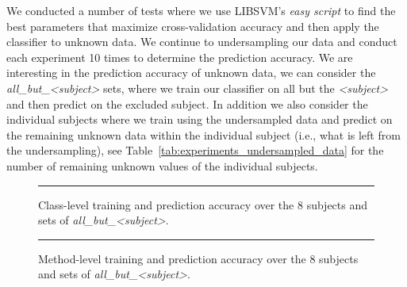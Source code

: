 We conducted a number of tests where we use LIBSVM's \emph{easy script} to find the best parameters that maximize cross-validation accuracy and then apply the classifier to unknown data. We continue to undersampling our data and conduct each experiment 10 times to determine the prediction accuracy. We are interesting in the prediction accuracy of unknown data, we can consider the \emph{all\_but\_<subject>} sets, where we train our classifier on all but the \emph{<subject>} and then predict on the excluded subject. In addition we also consider the individual subjects where we train using the undersampled data and predict on the remaining unknown data within the individual subject (i.e., what is left from the undersampling), see Table~\ref{tab:experiments_undersampled_data} for the number of remaining unknown values of the individual subjects.

\begin{figure}[!ht]
  \centering
  \begin{adjustbox}{max size={.95\textwidth}{.95\textheight}}
    
  \end{adjustbox}
  \caption{Class-level training and prediction accuracy over the 8 subjects and sets of \emph{all\_but\_<subject>}.}
  \vspace{2mm}
  \hrule
  \label{fig:prediction_class_graph}
\end{figure}

\begin{figure}[!ht]
  \centering
  \begin{adjustbox}{max size={.95\textwidth}{.95\textheight}}
    
  \end{adjustbox}
  \caption{Method-level training and prediction accuracy over the 8 subjects and sets of \emph{all\_but\_<subject>}.}
  \vspace{2mm}
  \hrule
  \label{fig:prediction_method_graph}
\end{figure}


